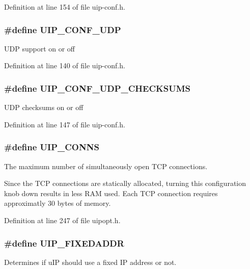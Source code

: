 Definition at line 154 of file uip-\/conf.h.

\hypertarget{group__uipfw_ga763f12007aad8cc0e483bf50f8a8d9b4}{
\subsubsection[{UIP\_\-CONF\_\-UDP}]{\setlength{\rightskip}{0pt plus 5cm}\#define UIP\_\-CONF\_\-UDP}}
\label{group__uipfw_ga763f12007aad8cc0e483bf50f8a8d9b4}
UDP support on or off 

Definition at line 140 of file uip-\/conf.h.

\hypertarget{group__uipfw_ga9dd44616d41cef74d3beb51d8be5ecec}{
\subsubsection[{UIP\_\-CONF\_\-UDP\_\-CHECKSUMS}]{\setlength{\rightskip}{0pt plus 5cm}\#define UIP\_\-CONF\_\-UDP\_\-CHECKSUMS}}
\label{group__uipfw_ga9dd44616d41cef74d3beb51d8be5ecec}
UDP checksums on or off 

Definition at line 147 of file uip-\/conf.h.

\hypertarget{group__uipopt_gaf5fe83be78b78b9e7d9e7f1e34ab1cc5}{
\subsubsection[{UIP\_\-CONNS}]{\setlength{\rightskip}{0pt plus 5cm}\#define UIP\_\-CONNS}}
\label{group__uipopt_gaf5fe83be78b78b9e7d9e7f1e34ab1cc5}
The maximum number of simultaneously open TCP connections.

Since the TCP connections are statically allocated, turning this configuration knob down results in less RAM used. Each TCP connection requires approximatly 30 bytes of memory. 

Definition at line 247 of file uipopt.h.

\hypertarget{group__uipopt_ga51195ea7cd5aa387a87f9d3b23905b62}{
\subsubsection[{UIP\_\-FIXEDADDR}]{\setlength{\rightskip}{0pt plus 5cm}\#define UIP\_\-FIXEDADDR}}
\label{group__uipopt_ga51195ea7cd5aa387a87f9d3b23905b62}
Determines if uIP should use a fixed IP address or not.

